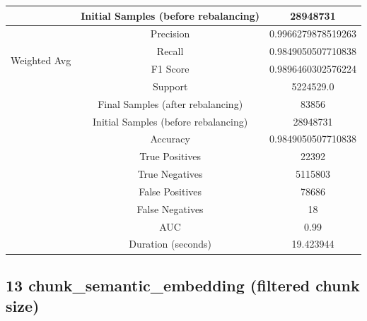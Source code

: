 \begin{longtable}{|c|c|c|}
 & Initial Samples (before rebalancing) & 28948731 \\
\hline
\multirow{4}{*}{Weighted Avg} & Precision & 0.9966279878519263 \\
 & Recall & 0.9849050507710838 \\
 & F1 Score & 0.9896460302576224 \\
 & Support & 5224529.0 \\
 & Final Samples (after rebalancing) & 83856 \\
 & Initial Samples (before rebalancing) & 28948731 \\
\hline
& Accuracy & 0.9849050507710838 \\ \hline
& True Positives & 22392 \\ \hline
& True Negatives & 5115803 \\ \hline
& False Positives & 78686 \\ \hline
& False Negatives & 18 \\ \hline
& AUC & 0.99 \\ \hline
& Duration (seconds) & 19.423944 \\ \hline
\end{longtable}


\subsection{13 chunk\_semantic\_embedding (filtered chunk size)}


